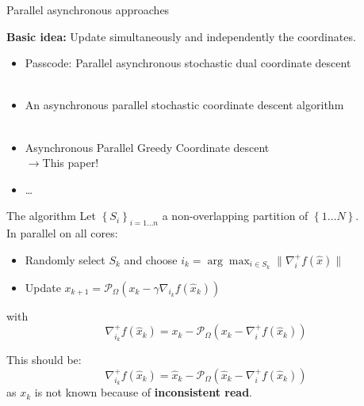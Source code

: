 \documentclass{beamer}
\def\mycite#1{\hfill\textcolor{gray}{\cite{#1}}}
\begin{document}
\begin{frame}{Parallel asynchronous approaches}

{\bf Basic idea:} Update simultaneously and independently the coordinates.\\[1em]

\begin{itemize}\itemsep.5em
	\item Passcode: Parallel asynchronous stochastic dual coordinate descent\\\mycite{hsieh2015passcode}\\
	\item An asynchronous parallel stochastic coordinate descent algorithm \\\mycite{liu2015asynchronous}\\
	\item Asynchronous Parallel Greedy Coordinate descent \\$\rightarrow$This paper! \mycite{you2016asynchronous}\\
	\item \dots

\end{itemize}

\end{frame}

\begin{frame}{The algorithm}
	Let $\left \{ S_i \right \}_{i=1\dots n} $ a non-overlapping partition of $\left \{ 1\dots N \right \}$.\\
	In parallel on all cores:\\[.7em]
\begin{itemize}\itemsep1em
	\item Randomly select $S_k$  and choose $i_k = \arg\max_{i \in S_k} \|\nabla^+_if(\widehat x)\|$ 
	\item Update $x_{k+1} = \mathcal P_\Omega\left( x_k - \gamma \nabla_{i_k} f(\widehat x_k)\right)$ 
\end{itemize}
with \[
	\nabla_{i_k}^+f(\widehat x_k) = x_k - \mathcal P_\Omega\left(x_k - \nabla_{i}^+f(\widehat x_k) \right)
\]

{\color{gray} This should be:
\[
	\nabla_{i_k}^+f(\widehat x_k) = \widehat x_k - \mathcal P_\Omega\left(\widehat x_k - \nabla_{i}^+f(\widehat x_k) \right)
\]as $x_k$ is not known because of {\bf inconsistent read}.
}
	
\end{frame}
\end{document}
